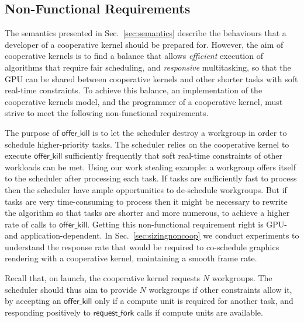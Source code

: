 \documentclass[parskip=half,sigconf,review, anonymous=true, acmcopyrightmode=none]{acmart}
\makeatletter
\renewcommand\paragraph{\@startsection{paragraph}{4}{\z@}%
  {-.5\baselineskip \@plus -2\p@ \@minus -.2\p@}%
  {-3.5\p@}%
  {\bfseries\@parfont}}
\newcommand{\mysec}{Sec.~}
\newcommand{\offerfork}{\mathsf{request\_fork}}
\newcommand{\offerkill}{\mathsf{offer\_kill}}
\makeatother
\begin{document}
\subsection{Non-Functional Requirements}\label{sec:nonfunctional}

The semantics presented in \mysec\ref{sec:semantics} describe the 
behaviours that a developer of a cooperative kernel should be prepared
for.
%
However, the aim of cooperative kernels is to find a balance that
allows \emph{efficient} execution of algorithms that require fair scheduling, and
\emph{responsive} multitasking, so that the GPU can be shared between
cooperative kernels and other shorter tasks with soft real-time constraints.
%
To achieve this balance, an implementation of the cooperative
kernels model, and the programmer of a cooperative kernel, must strive
to meet the following non-functional requirements.


The purpose of $\offerkill$ is to let the scheduler destroy a workgroup
in order to schedule higher-priority tasks.  The scheduler relies on the
cooperative kernel to execute $\offerkill$ sufficiently frequently that
soft real-time constraints of other workloads can be met.
%
Using our work stealing example: a workgroup offers itself to
the scheduler after processing each task.  If tasks are sufficiently
fast to process then the scheduler have ample opportunities to
de-schedule workgroups.  But if tasks are very time-consuming to
process then it might be necessary to rewrite the algorithm so that
tasks are shorter and more numerous, to achieve a higher rate of calls
to $\offerkill$.
%
Getting this non-functional requirement right is GPU- and
application-dependent.  In \mysec\ref{sec:sizingnoncoop} we conduct
experiments to understand the response rate that would be required to
co-schedule graphics rendering with a cooperative kernel, maintaining
a smooth frame rate.


Recall that, on launch, the cooperative kernel requests $N$ workgroups.
The scheduler should thus aim to provide $N$ workgroups if other constraints allow it,
by accepting an $\offerkill$ only if a compute unit is required for another
task, and responding positively to $\offerfork$ calls if compute units are available.  
\end{document}
